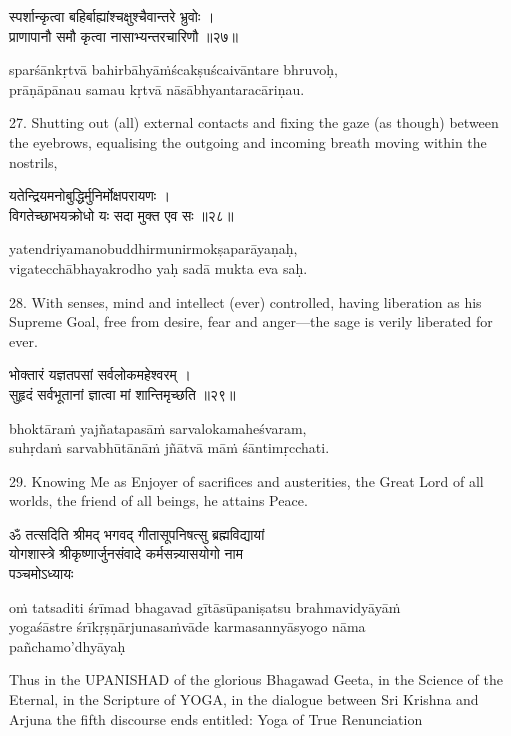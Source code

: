 \begin{gitaverse}
स्पर्शान्कृत्वा बहिर्बाह्यांश्चक्षुश्चैवान्तरे भ्रुवोः । \\
प्राणापानौ समौ कृत्वा नासाभ्यन्तरचारिणौ ॥२७॥
\end{gitaverse}

\begin{transliteration}
sparśānkṛtvā bahirbāhyāṁścakṣuścaivāntare bhruvoḥ, \\
prāṇāpānau samau kṛtvā nāsābhyantaracāriṇau.
\end{transliteration}

27. Shutting out (all) external contacts and fixing the gaze (as though)
between the eyebrows, equalising the outgoing and incoming breath moving within
the nostrils,

\begin{gitaverse}
यतेन्द्रियमनोबुद्धिर्मुनिर्मोक्षपरायणः । \\
विगतेच्छाभयक्रोधो यः सदा मुक्त एव सः ॥२८॥
\end{gitaverse}

\begin{transliteration}
yatendriyamanobuddhirmunirmokṣaparāyaṇaḥ, \\
vigatecchābhayakrodho yaḥ sadā mukta eva saḥ.
\end{transliteration}

28. With senses, mind and intellect (ever) controlled, having liberation as his
Supreme Goal, free from desire, fear and anger---the sage is verily liberated
for ever.

\begin{gitaverse}
भोक्तारं यज्ञतपसां सर्वलोकमहेश्वरम् । \\
सुहृदं सर्वभूतानां ज्ञात्वा मां शान्तिमृच्छति ॥२९॥
\end{gitaverse}

\begin{transliteration}
bhoktāraṁ yajñatapasāṁ sarvalokamaheśvaram, \\
suhṛdaṁ sarvabhūtānāṁ jñātvā māṁ śāntimṛcchati.
\end{transliteration}

29. Knowing Me as Enjoyer of sacrifices and austerities, the Great Lord of all
worlds, the friend of all beings, he attains Peace.

\begin{gitaverse}
ॐ तत्सदिति श्रीमद् भगवद् गीतासूपनिषत्सु ब्रह्मविद्यायां \\
योगशास्त्रे श्रीकृष्णार्जुनसंवादे कर्मसन्न्यासयोगो नाम \\
पञ्चमोऽध्यायः
\end{gitaverse}

\begin{transliteration}
oṁ tatsaditi śrīmad bhagavad gītāsūpaniṣatsu brahmavidyāyāṁ \\
yogaśāstre śrīkṛṣṇārjunasaṁvāde karmasannyāsyogo nāma \\
pañchamo'dhyāyaḥ
\end{transliteration}

Thus in the UPANISHAD of the glorious Bhagawad Geeta, in the Science of the
Eternal, in the Scripture of YOGA, in the dialogue between Sri Krishna and
Arjuna the fifth discourse ends entitled: Yoga of True Renunciation
